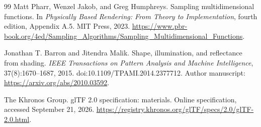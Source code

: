 \documentclass[11pt,letterpaper]{article}
\begin{document}
\begin{thebibliography}{99}
Matt Pharr, Wenzel Jakob, and Greg Humphreys.
\newblock Sampling multidimensional functions.
\newblock In \emph{Physically Based Rendering: From Theory to Implementation}, fourth edition, Appendix A.5. MIT Press, 2023.
\newblock \url{https://www.pbr-book.org/4ed/Sampling_Algorithms/Sampling_Multidimensional_Functions}.

Jonathan T. Barron and Jitendra Malik.
\newblock Shape, illumination, and reflectance from shading.
\newblock \emph{IEEE Transactions on Pattern Analysis and Machine Intelligence}, 37(8):1670--1687, 2015.
\newblock doi:10.1109/TPAMI.2014.2377712.
\newblock Author manuscript: \url{https://arxiv.org/abs/2010.03592}.

The Khronos Group.
\newblock glTF 2.0 specification: materials.
\newblock Online specification, accessed September 21, 2026.
\newblock \url{https://registry.khronos.org/glTF/specs/2.0/glTF-2.0.html}.

\end{thebibliography}
\end{document}
